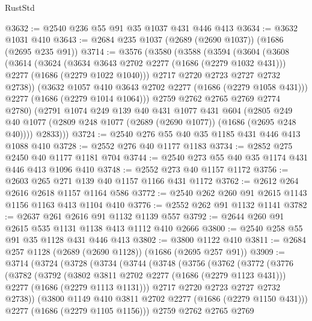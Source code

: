 \begin{lexlean}{RustStd}
\begin{coremodule}
@3632 := @2540 @236 @55 @91 @35 @1037 @431 @446 @413
@3634 := @3632 @1031 @410
@3643 := @2684 @235 @1037 (@2689 (@2690 @1037)) (@1686 (@2695 @235 @91))
@3714 := @3576
    (@3580
      (@3588
        (@3594
          (@3604
            (@3608
              (@3614
                (@3624
                  (@3634 @3643 @2702 @2277 (@1686 (@2279 @1032 @431)))
                  @2277
                  (@1686 (@2279 @1022 @1040)))
                @2717
                @2720
                @2723
                @2727
                @2732
                @2738))
            (@3632 @1057 @410 @3643 @2702 @2277 (@1686 (@2279 @1058 @431)))
            @2277
            (@1686 (@2279 @1014 @1064)))
          @2759
          @2762
          @2765
          @2769
          @2774
          @2780)
        (@2791
          @1074
          @249
          @139
          @40
          @431
          @1077
          @431
          @604
          (@2805 @249 @40 @1077 (@2809 @248 @1077 (@2689 (@2690 @1077)) (@1686 (@2695 @248 @40))))
          @2833)))
@3724 := @2540 @276 @55 @40 @35 @1185 @431 @446 @413 @1088 @410
@3728 := @2552 @276 @40 @1177 @1183
@3734 := @2852 @275 @2450 @40 @1177 @1181 @704
@3744 := @2540 @273 @55 @40 @35 @1174 @431 @446 @413 @1096 @410
@3748 := @2552 @273 @40 @1157 @1172
@3756 := @2603 @265 @271 @139 @40 @1157 @1166 @431 @1172
@3762 := @2612 @264 @2616 @2618 @1157 @1164 @586
@3772 := @2540 @262 @260 @91 @2615 @1143 @1156 @1163 @413 @1104 @410
@3776 := @2552 @262 @91 @1132 @1141
@3782 := @2637 @261 @2616 @91 @1132 @1139 @557
@3792 := @2644 @260 @91 @2615 @535 @1131 @1138 @413 @1112 @410 @2666
@3800 := @2540 @258 @55 @91 @35 @1128 @431 @446 @413
@3802 := @3800 @1122 @410
@3811 := @2684 @257 @1128 (@2689 (@2690 @1128)) (@1686 (@2695 @257 @91))
@3909 := @3714
    (@3724
      (@3728
        (@3734
          (@3744
            (@3748
              (@3756
                (@3762
                  (@3772
                    (@3776
                      (@3782
                        (@3792
                          (@3802 @3811 @2702 @2277 (@1686 (@2279 @1123 @431)))
                          @2277
                          (@1686 (@2279 @1113 @1131)))
                        @2717
                        @2720
                        @2723
                        @2727
                        @2732
                        @2738))
                    (@3800 @1149 @410 @3811 @2702 @2277 (@1686 (@2279 @1150 @431)))
                    @2277
                    (@1686 (@2279 @1105 @1156)))
                  @2759
                  @2762
                  @2765
                  @2769

\end{coremodule}
\end{lexlean}
